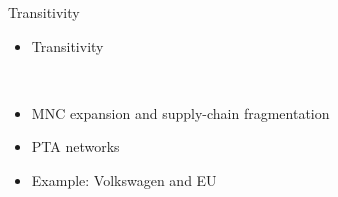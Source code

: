\documentclass{beamer}
\begin{document}
\begin{frame}{Transitivity}

\begin{itemize}
\item{Transitivity}

\\
\justifying
\item{MNC expansion and supply-chain fragmentation}
\item{PTA networks}
\item{Example: Volkswagen and EU}

\end{itemize}



\end{frame}
\end{document}
